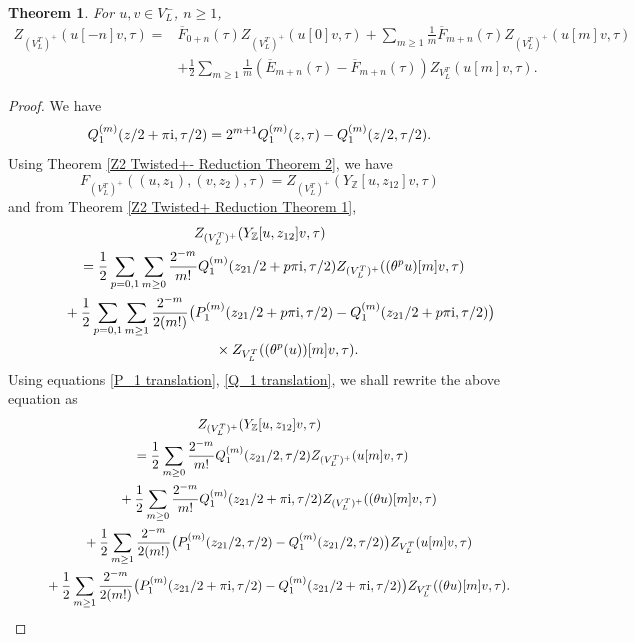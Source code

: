 \documentclass[pdftex]{sigma}
\numberwithin{equation}{section}
\newtheorem{Theorem}{Theorem}[section]
\theoremstyle{definition}
\begin{document}
\begin{Theorem}\label{+-twisted recursion formulas}
 For $u,v\in V_L^-$, $n\geq 1$,
 \begin{align*}
 Z_{(V_L^T)^+}(u[-n]v,\tau)={}&\overline{F}_{0+n}(\tau)Z_{(V_L^T)^+}(u[0]v,\tau)+\sum_{m\geq 1}\frac{1}{m}\overline{F}_{m+n}(\tau)Z_{(V_L^T)^+}(u[m]v,\tau)\\
 &+\frac{1}{2}\sum_{m\geq 1}\frac{1}{m}\left(\overline{E}_{m+n}(\tau)-\overline{F}_{m+n}(\tau)\right)Z_{V_L^T}(u[m]v, \tau).\end{align*}
\end{Theorem}

\begin{proof}

We have
\begin{equation}\label{Q_1 translation}
 Q_1^{(m)}(z/2+\pi {\rm i},\tau/2)=2^{m+1}Q_1^{(m)}(z,\tau)-Q_1^{(m)}(z/2,\tau/2).
\end{equation}
Using Theorem \ref{Z2 Twisted+- Reduction Theorem 2}, we have
\[F_{(V_L^T)^+}((u,z_1),(v,z_2),\tau)=Z_{(V_L^T)^+}(Y_{\mathbb{Z}}[u,z_{12}]v,\tau)\]
and from Theorem \ref{Z2 Twisted+ Reduction Theorem 1},
\begin{gather*}
Z_{(V_L^T)^+}(Y_{\mathbb{Z}}[u,z_{12}]v,\tau)\\
\qquad=\frac{1}{2}\sum_{p=0,1}\sum_{m\geq 0}\frac{2^{-m}}{m!} Q_1^{(m)}(z_{21}/2+p\pi {\rm i},\tau/2) Z_{(V_L^T)^+}((\theta^pu)[m]v,\tau)\\
\phantom{\qquad=}{}
 +\frac{1}{2}\sum_{p=0,1}\sum_{m\geq 1}\frac{2^{-m}}{2(m!)}\bigl( P_1^{(m)}(z_{21}/2+p\pi {\rm i},\tau/2)-Q_1^{(m)}(z_{21}/2+p\pi {\rm i},\tau/2)\bigr)\\
\phantom{\qquad=+}{}\times Z_{V_L^T}((\theta^p(u))[m]v, \tau).
\end{gather*}
Using equations \eqref{P_1 translation}, \eqref{Q_1 translation}, we shall rewrite the above equation as
\begin{gather*}
Z_{(V_L^T)^+}(Y_{\mathbb{Z}}[u,z_{12}]v,\tau)\\
\qquad=\frac{1}{2}\sum_{m\geq 0}\frac{2^{-m}}{m!} Q_1^{(m)}(z_{21}/2,\tau/2) Z_{(V_L^T)^+}(u[m]v,\tau)\\
\phantom{\qquad=}{}+\frac{1}{2}\sum_{m\geq 0}\frac{2^{-m}}{m!} Q_1^{(m)}(z_{21}/2+\pi {\rm i},\tau/2) Z_{(V_L^T)^+}((\theta u)[m]v,\tau)\\
\phantom{\qquad=}{}+\frac{1}{2}\sum_{m\geq 1}\frac{2^{-m}}{2(m!)}\bigl( P_1^{(m)}(z_{21}/2,\tau/2)-Q_1^{(m)}(z_{21}/2,\tau/2)\bigr)Z_{V_L^T}(u[m]v, \tau)\\
\phantom{\qquad=}{}+\frac{1}{2}\sum_{m\geq 1}\frac{2^{-m}}{2(m!)}\bigl( P_1^{(m)}(z_{21}/2+\pi {\rm i},\tau/2)-Q_1^{(m)}(z_{21}/2+\pi {\rm i},\tau/2)\bigr)Z_{V_L^T}((\theta u)[m]v, \tau).\end{gather*}

\end{proof}
\end{document}
